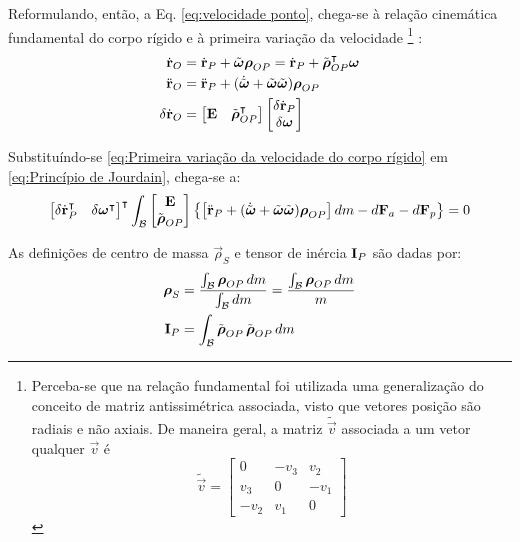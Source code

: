Reformulando, então, a Eq. \eqref{eq:velocidade ponto}, chega-se à relação cinemática fundamental do corpo rígido e à primeira variação da velocidade \footnote{Perceba-se que na relação fundamental foi utilizada uma generalização do conceito de matriz antissimétrica associada, visto que vetores posição são radiais e não axiais. De maneira geral, a matriz $\tilde{\vec{v}}$ associada a um vetor qualquer $\vec{v}$ é \[ \tilde{\vec{v}} =
\begin{bmatrix}
0 & -v_3 & v_2 \\ v_3 & 0 & -v_1 \\ -v_2 & v_1 & 0 
\end{bmatrix}
\]} \cite{franca_mecanica_2004}:
\begin{align}
 \dot{\boldsymbol{\mathrm{r}}}_O &= \dot{\boldsymbol{\mathrm{r}}}_P + \tilde{\boldsymbol{\mathrm{\omega}}}\boldsymbol{\mathrm{\rho}}_{OP} = \dot{\boldsymbol{\mathrm{r}}}_P + \tilde{\boldsymbol{\mathrm{\rho}}}_{OP}^\intercal \boldsymbol{\mathrm{\omega}} \label{eq:relação fundamental CR} \\
 \ddot{\boldsymbol{\mathrm{r}}}_O &= \ddot{\boldsymbol{\mathrm{r}}}_P + (\dot{\tilde{\boldsymbol{\mathrm{\omega}}}} + \tilde{\boldsymbol{\mathrm{\omega}}}\tilde{\boldsymbol{\mathrm{\omega}}})\boldsymbol{\mathrm{\rho}}_{OP} \\
 \delta\dot{\boldsymbol{\mathrm{r}}}_O &= \begin{bmatrix}\boldsymbol{\mathrm{E}} & \tilde{\boldsymbol{\mathrm{\rho}}}_{OP}^\intercal\end{bmatrix}\begin{bmatrix} \delta\dot{\boldsymbol{\mathrm{r}}}_P \\ \delta\boldsymbol{\mathrm{\omega}} \end{bmatrix} \label{eq:Primeira variação da velocidade do corpo rígido}
\end{align}

Substituíndo-se \eqref{eq:Primeira variação da velocidade do corpo rígido} em \eqref{eq:Princípio de Jourdain}, chega-se a:
\begin{align}
 \begin{bmatrix} \delta\dot{\boldsymbol{\mathrm{r}}}_P^\intercal & \delta\boldsymbol{\mathrm{\omega}}^\intercal \end{bmatrix}^\intercal \int_\mathcal{B}{\begin{bmatrix}\boldsymbol{\mathrm{E}} \\ \tilde{\boldsymbol{\mathrm{\rho}}}_{OP} \end{bmatrix} \left\{ \left[ \ddot{\boldsymbol{\mathrm{r}}}_P + (\dot{\tilde{\boldsymbol{\mathrm{\omega}}}} + \tilde{\boldsymbol{\mathrm{\omega}}}\tilde{\boldsymbol{\mathrm{\omega}}})\boldsymbol{\mathrm{\rho}}_{OP} \right]dm - d\boldsymbol{\mathrm{F}}_a - d\boldsymbol{\mathrm{F}}_p \right\}} = 0 \label{eq:Equação Jourdain movimento}
\end{align}

As definições de centro de massa $\vec{\rho}_S$ e tensor de inércia $\boldsymbol{\mathrm{I}}_P$ são dadas por:
\begin{align}
 \boldsymbol{\mathrm{\rho}}_S &= \frac{\int_\mathcal{B}{\boldsymbol{\mathrm{\rho}}_{OP}}\,dm}{\int_\mathcal{B}{dm}} = \frac{\int_\mathcal{B}{\boldsymbol{\mathrm{\rho}}_{OP}}\,dm}{m} \\
 \boldsymbol{\mathrm{I}}_P &= \int_\mathcal{B}{\tilde{\boldsymbol{\mathrm{\rho}}}_{OP}\,\tilde{\boldsymbol{\mathrm{\rho}}}_{OP}\,dm}
\end{align}

